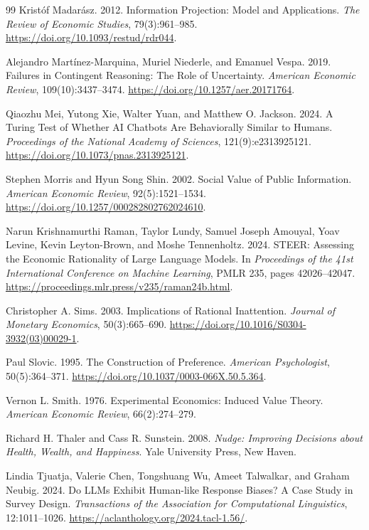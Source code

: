 \documentclass[11pt]{article}
\begin{document}
{\begin{thebibliography}{99}
 Krist\'of Madar\'asz. 2012. Information Projection: Model and Applications. \emph{The Review of Economic Studies}, 79(3):961--985. \url{https://doi.org/10.1093/restud/rdr044}.

Alejandro Mart\'inez-Marquina, Muriel Niederle, and Emanuel Vespa. 2019.
Failures in Contingent Reasoning: The Role of Uncertainty.
\emph{American Economic Review}, 109(10):3437--3474.
\url{https://doi.org/10.1257/aer.20171764}.

Qiaozhu Mei, Yutong Xie, Walter Yuan, and Matthew O. Jackson. 2024.
A Turing Test of Whether AI Chatbots Are Behaviorally Similar to Humans.
\emph{Proceedings of the National Academy of Sciences}, 121(9):e2313925121.
\url{https://doi.org/10.1073/pnas.2313925121}.

Stephen Morris and Hyun Song Shin. 2002.
Social Value of Public Information.
\emph{American Economic Review}, 92(5):1521--1534.
\url{https://doi.org/10.1257/000282802762024610}.

Narun Krishnamurthi Raman, Taylor Lundy, Samuel Joseph Amouyal, Yoav Levine, Kevin Leyton-Brown, and Moshe Tennenholtz. 2024.
STEER: Assessing the Economic Rationality of Large Language Models.
In \emph{Proceedings of the 41st International Conference on Machine Learning}, PMLR 235, pages 42026--42047.
\url{https://proceedings.mlr.press/v235/raman24b.html}.

 Christopher A. Sims. 2003. Implications of Rational Inattention. \emph{Journal of Monetary Economics}, 50(3):665--690. \url{https://doi.org/10.1016/S0304-3932(03)00029-1}.

Paul Slovic. 1995.
The Construction of Preference.
\emph{American Psychologist}, 50(5):364--371.
\url{https://doi.org/10.1037/0003-066X.50.5.364}.

Vernon L. Smith. 1976.
Experimental Economics: Induced Value Theory.
\emph{American Economic Review}, 66(2):274--279.

Richard H. Thaler and Cass R. Sunstein. 2008.
\emph{Nudge: Improving Decisions about Health, Wealth, and Happiness}.
Yale University Press, New Haven.

Lindia Tjuatja, Valerie Chen, Tongshuang Wu, Ameet Talwalkar, and Graham Neubig. 2024.
Do LLMs Exhibit Human-like Response Biases? A Case Study in Survey Design.
\emph{Transactions of the Association for Computational Linguistics}, 12:1011--1026.
\url{https://aclanthology.org/2024.tacl-1.56/}.


\end{thebibliography}}
\end{document}
